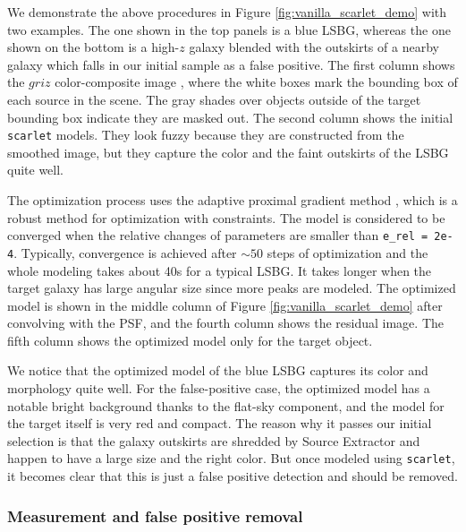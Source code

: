 \documentclass[twocolumn,astrosymb,twocolappendix]{aastex631}
\newcommand{\code}[1]{\texttt{#1}}
\begin{document}
\begin{CJK*}{UTF8}{gbsn}
We demonstrate the above procedures in Figure \ref{fig:vanilla_scarlet_demo} with two examples. The one shown in the top panels is a blue LSBG, whereas the one shown on the bottom is a high-$z$ galaxy blended with the outskirts of a nearby galaxy which falls in our initial sample as a false positive. The first column shows the $griz$ color-composite image \citep{Lupton2004}, where the white boxes mark the bounding box of each source in the scene. The gray shades over objects outside of the target bounding box indicate they are masked out. The second column shows the initial \code{scarlet} models. They look fuzzy because they are constructed from the smoothed image, but they capture the color and the faint outskirts of the LSBG quite well. 

The optimization process uses the adaptive proximal gradient method \citep{Melchior2019}, which is a robust method for optimization with constraints. The model is considered to be converged when the relative changes of parameters are smaller than \code{e\_rel\,=\,2e-4}. Typically, convergence is achieved after $\sim 50$ steps of optimization and the whole modeling takes about 40s for a typical LSBG. It takes longer when the target galaxy has large angular size since more peaks are modeled. The optimized model is shown in the middle column of Figure \ref{fig:vanilla_scarlet_demo} after convolving with the PSF, and the fourth column shows the residual image. The fifth column shows the optimized model only for the target object. 

We notice that the optimized model of the blue LSBG captures its color and morphology quite well. For the false-positive case, the optimized model has a notable bright background thanks to the flat-sky component, and the model for the target itself is very red and compact. The reason why it passes our initial selection is that the galaxy outskirts are shredded by Source Extractor and happen to have a large size and the right color. But once modeled using \code{scarlet}, it becomes clear that this is just a false positive detection and should be removed. 


\subsubsection{Measurement and false positive removal}\label{sec:non-par-measurement}


\end{CJK*}
\end{document}
